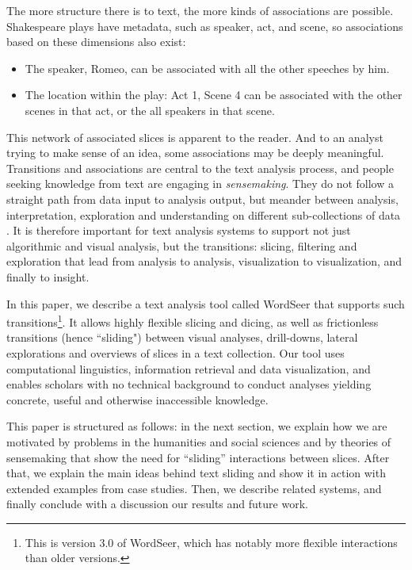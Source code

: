 \documentclass{sig-alternate}
\begin{document}
The more structure there is to text, the more kinds of associations are possible. Shakespeare plays have metadata, such as speaker, act, and scene, so associations based on these dimensions also exist:
\begin{itemize}
\item The speaker, Romeo, can be associated with all the other speeches by him.
\item The location within the play: Act 1, Scene 4 can be associated with the other scenes in that act, or the all speakers in that scene.
\end{itemize}

This network of associated slices is apparent to the reader. And to an analyst trying to make sense of an idea, some associations may be deeply meaningful.  Transitions  and associations are central to the text analysis process, and people seeking knowledge from text are engaging in \emph{sensemaking}. They do not follow a straight path from data input to analysis output, but meander between analysis, interpretation, exploration and understanding on different sub-collections of data \cite{russell_cost_1993, russell_being_2006, pirolli_sensemaking_2005}.  It is therefore important for text analysis systems to support not just algorithmic and visual analysis, but the transitions: slicing, filtering and exploration that lead from analysis to analysis, visualization to visualization, and finally to insight.

In this paper, we describe a text analysis tool called WordSeer that supports such transitions\footnote{This is version 3.0 of WordSeer, which has notably more flexible interactions than older versions.}.  It allows highly flexible slicing and dicing, as well as frictionless transitions (hence ``sliding") between visual analyses, drill-downs, lateral explorations and overviews of slices in a text collection. Our tool uses computational linguistics, information retrieval and data visualization, and enables scholars with no technical background to conduct analyses yielding concrete, useful and otherwise inaccessible knowledge. 

This paper is structured as follows: in the next section, we explain how we are motivated  by problems in the  humanities and social sciences and by theories of sensemaking that show the need for ``sliding'' interactions between slices. After that, we explain the main ideas behind text sliding and show it in action with extended examples from case studies. Then, we describe related systems, and finally conclude with a discussion our results and future work.
\end{document}

